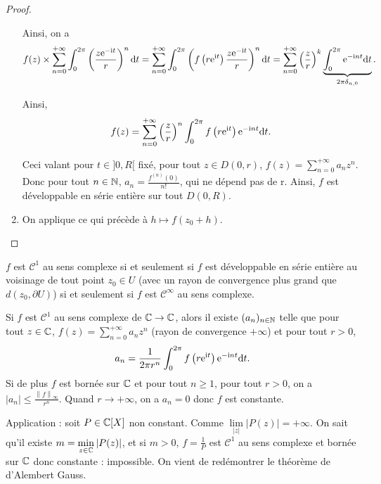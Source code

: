 \documentclass[12pt]{article}
\begin{document}
\begin{proof}
\begin{enumerate}
        Ainsi, on a 
        \begin{equation}
            f(z)\times\sum_{n=0}^{+\infty}\int_{0}^{2\pi}\left(\frac{z\mathrm{e}^{-\mathrm{i} t}}{r}\right)^{n}\mathrm{d} t=\sum_{n=0}^{+\infty}\int_{0}^{2\pi}\left(f\left(r\mathrm{e}^{\mathrm{i} t}\right)\frac{z\mathrm{e}^{-\mathrm{i} t}}{r}\right)^{n}\mathrm{d} t=\sum_{n=0}^{+\infty}\left(\frac{z}{r}\right)^{k}\underbrace{\int_{0}^{2\pi}\mathrm{e}^{-\mathrm{i} nt}\mathrm{d} t}_{2\pi\delta_{n,0}}.
        \end{equation}

        Ainsi,
        \begin{equation}
            f(z)=\sum_{n=0}^{+\infty}\left(\frac{z}{r}\right)^{n}\int_{0}^{2\pi}f\left(r\mathrm{e}^{\mathrm{i} t}\right)\mathrm{e}^{-\mathrm{i} nt}\mathrm{d} t.
        \end{equation}

        Ceci valant pour $t\in]0,R[$ fixé, pour tout $z\in D(0,r)$, $f(z)=\sum_{n=0}^{+\infty}a_n z^{n}$. Donc pour tout $n\in\mathbb{N}$, $a_n=\frac{f^{(n)}(0)}{n!}$, qui ne dépend pas de r. Ainsi, $f$ est développable en série entière sur tout $D(0,R)$.

        \item On applique ce qui précède à $h\mapsto f(z_{0}+h)$.
    \end{enumerate}
\end{proof}

\begin{remark}
    $f$ est $\mathcal{C}^{1}$ au sens complexe si et seulement si $f$ est développable en série entière au voisinage de tout point $z_{0}\in U$ (avec un rayon de convergence plus grand que $d(z_{0},\partial U)$) si et seulement si $f$ est $\mathcal{C}^{\infty}$ au sens complexe.
\end{remark}

\begin{remark}
    Si $f$ est $\mathcal{C}^{1}$ au sens complexe de $\mathbb{C}\to\mathbb{C}$, alors il existe $(a_n)_{n\in\mathbb{N}}$ telle que pour tout $z\in\mathbb{C}$, $f(z)=\sum_{n=0}^{+\infty}a_nz^{n}$ (rayon de convergence $+\infty$) et pour tout $r>0$,
    \begin{equation}
        a_n=\frac{1}{2\pi r^{n}}\int_{0}^{2\pi}f\left(r\mathrm{e}^{\mathrm{i} t}\right)\mathrm{e}^{-\mathrm{i} nt}\mathrm{d} t.
    \end{equation}
    Si de plus $f$ est bornée sur $\mathbb{C}$ et pour tout $n\geqslant1$, pour tout $r>0$, on a $\left\lvert a_n\right\rvert\leqslant\frac{\left\lVert f\right\rVert_{\infty}}{r^{n}}$. Quand $r\to+\infty$, on a $a_n=0$ donc $f$ est constante.

    Application : soit $P\in\mathbb{C}[X]$ non constant. Comme $\lim\limits_{\left\lvert z\right\rvert}\left\lvert P(z)\right\rvert=+\infty$. On sait qu'il existe $m=\min\limits_{z\in\mathbb{C}}\left\lvert P(z)\right\rvert$, et si $m>0$, $f=\frac{1}{P}$ est $\mathcal{C}^{1}$ au sens complexe et bornée sur $\mathbb{C}$ donc constante : impossible. On vient de redémontrer le théorème de d'Alembert Gauss.
\end{remark}
\end{document}
